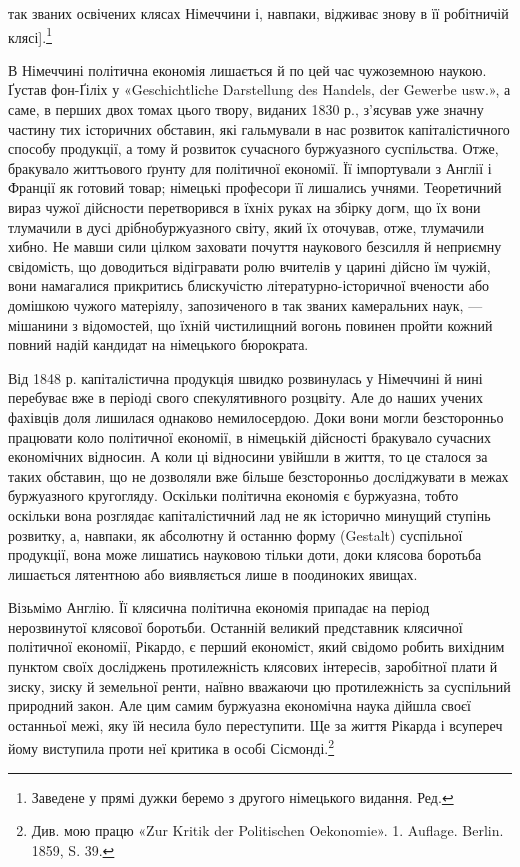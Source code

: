 \parcont{}  %
так званих освічених клясах Німеччини і, навпаки, відживає
знову в її робітничій клясі].\footnote*{
Заведене у прямі дужки беремо з другого німецького видання. Ред.
}

В Німеччині політична економія лишається й по цей час чужоземною
наукою. Ґустав фон-Ґіліх у «Geschichtliche Darstellung
des Handels, der Gewerbe usw.», а саме, в перших двох томах
цього твору, виданих 1830 р., з’ясував уже значну частину тих
історичних обставин, які гальмували в нас розвиток капіталістичного
способу продукції, а тому й розвиток сучасного буржуазного
суспільства. Отже, бракувало життьового ґрунту для політичної
економії. Її імпортували з Англії і Франції як готовий товар;
німецькі професори її лишались учнями. Теоретичний вираз чужої
дійсности перетворився в їхніх руках на збірку догм, що їх
вони тлумачили в дусі дрібнобуржуазного світу, який їх оточував,
отже, тлумачили хибно. Не мавши сили цілком заховати почуття
наукового безсилля й неприємну свідомість, що доводиться
відігравати ролю вчителів у царині дійсно їм чужій, вони намагалися
прикритись блискучістю літературно-історичної вчености
або домішкою чужого матеріялу, запозиченого в так званих камеральних
наук, — мішанини з відомостей, що їхній чистилищний
вогонь повинен пройти кожний повний надій кандидат на
німецького бюрократа.

Від 1848 р. капіталістична продукція швидко розвинулась у
Німеччині й нині перебуває вже в періоді свого спекулятивного
розцвіту. Але до наших учених фахівців доля лишилася однаково
немилосердою. Доки вони могли безсторонньо працювати коло
політичної економії, в німецькій дійсності бракувало сучасних економічних
відносин. А коли ці відносини увійшли в життя, то це сталося
за таких обставин, що не дозволяли вже більше безсторонньо
досліджувати в межах буржуазного кругогляду. Оскільки політична
економія є буржуазна, тобто оскільки вона розглядає капіталістичний
лад не як історично минущий ступінь розвитку,
а, навпаки, як абсолютну й останню форму (Gestalt) суспільної
продукції, вона може лишатись науковою тільки доти, доки клясова
боротьба лишається лятентною або виявляється лише в
поодиноких явищах.

Візьмімо Англію. Її клясична політична економія припадає на
період нерозвинутої клясової боротьби. Останній великий представник
клясичної політичної економії, Рікардо, є перший економіст,
який свідомо робить вихідним пунктом своїх досліджень
протилежність клясових інтересів, заробітної плати й зиску, зиску
й земельної ренти, наївно вважаючи цю протилежність за суспільний
природний закон. Але цим самим буржуазна економічна
наука дійшла своєї останньої межі, яку їй несила було переступити.
Ще за життя Рікарда і всупереч йому виступила проти
неї критика в особі Сісмонді.\footnote{
Див. мою працю «Zur Kritik der Politischen Oekonomie». 1. Auflage.
Berlin. 1859, S. 39.
}
